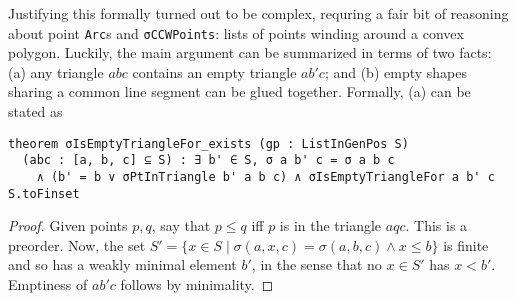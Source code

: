 Justifying this formally turned out to be complex,
requring a fair bit of reasoning about point \lstinline|Arc|s
and \lstinline|σCCWPoints|: lists of points winding around a convex polygon.
Luckily, the main argument can be summarized in terms of two facts:
(a) any triangle $abc$ contains an empty triangle $ab'c$; and
(b) empty shapes sharing a common line segment can be glued together.
Formally, (a) can be stated as

\begin{lstlisting}
theorem σIsEmptyTriangleFor_exists (gp : ListInGenPos S)
  (abc : [a, b, c] ⊆ S) : ∃ b' ∈ S, σ a b' c = σ a b c
    ∧ (b' = b ∨ σPtInTriangle b' a b c) ∧ σIsEmptyTriangleFor a b' c S.toFinset
\end{lstlisting}
\begin{proof}
  Given points $p,q$, say that $p \leq q$ iff $p$ is in the triangle $aqc$.
  This is a preorder.
  Now, the set $S' = \{x \in S \mid \sigma(a,x,c) = \sigma(a,b,c) \wedge x \leq b\}$
  is finite and so has a weakly minimal element $b'$,
  in the sense that no $x \in S'$ has $x < b'$.
  Emptiness of $ab'c$ follows by minimality.
\end{proof}

